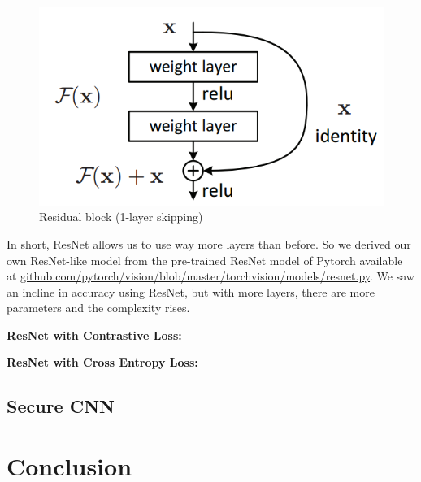 \begin{figure}[H]
  \includegraphics[scale=0.5]{fig/residualblock.png}
  \centering
  \caption{Residual block (1-layer skipping)}
  \label{fig:residualblock}
\end{figure}

In short, ResNet allows us to use way more layers than before. So we derived our own ResNet-like model from the pre-trained ResNet model of Pytorch available at \url{github.com/pytorch/vision/blob/master/torchvision/models/resnet.py}. We saw an incline in accuracy using ResNet, but with more layers, there are more parameters and the complexity rises.

\textbf{ResNet with Contrastive Loss:}

\textbf{ResNet with Cross Entropy Loss:}


\subsection{Secure CNN}
\label{SecureCNN}


\section{Conclusion}
